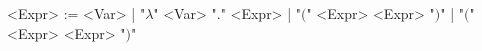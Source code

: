 \documentclass{article}
\begin{document}
\begin{ebnf}
<Expr> := <Var>
   | "$\lambda$" <Var> "." <Expr>
  | "$\lparen$" <Expr> <Expr> "$\rparen$"
  | "$\lparen$" <Expr> <Expr> "$\rparen$"
\end{ebnf}
\end{document}
